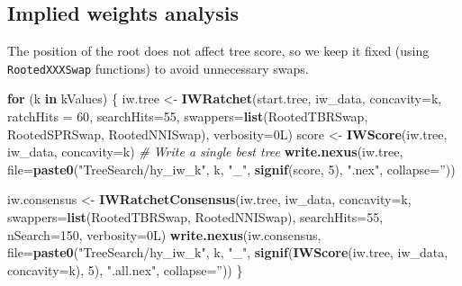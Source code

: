 \documentclass[openany]{book}
\newenvironment{Shaded}{\begin{snugshade}}{\end{snugshade}}
\newcommand{\KeywordTok}[1]{\textcolor[rgb]{0.13,0.29,0.53}{\textbf{#1}}}
\newcommand{\DataTypeTok}[1]{\textcolor[rgb]{0.13,0.29,0.53}{#1}}
\newcommand{\DecValTok}[1]{\textcolor[rgb]{0.00,0.00,0.81}{#1}}
\newcommand{\StringTok}[1]{\textcolor[rgb]{0.31,0.60,0.02}{#1}}
\newcommand{\CommentTok}[1]{\textcolor[rgb]{0.56,0.35,0.01}{\textit{#1}}}
\newcommand{\ControlFlowTok}[1]{\textcolor[rgb]{0.13,0.29,0.53}{\textbf{#1}}}
\newcommand{\NormalTok}[1]{#1}
\theoremstyle{definition}
\theoremstyle{definition}
\theoremstyle{definition}
\theoremstyle{remark}
\begin{document}
\subsection{Implied weights analysis}\label{implied-weights-analysis}

The position of the root does not affect tree score, so we keep it fixed
(using \texttt{RootedXXXSwap} functions) to avoid unnecessary swaps.

\begin{Shaded}
\begin{Highlighting}[]
\ControlFlowTok{for}\NormalTok{ (k }\ControlFlowTok{in}\NormalTok{ kValues) \{}
\NormalTok{  iw.tree <-}\StringTok{ }\KeywordTok{IWRatchet}\NormalTok{(start.tree, iw_data, }\DataTypeTok{concavity=}\NormalTok{k,}
                       \DataTypeTok{ratchHits =} \DecValTok{60}\NormalTok{, }\DataTypeTok{searchHits=}\DecValTok{55}\NormalTok{,}
                       \DataTypeTok{swappers=}\KeywordTok{list}\NormalTok{(RootedTBRSwap, RootedSPRSwap, RootedNNISwap),}
                       \DataTypeTok{verbosity=}\NormalTok{0L)}
\NormalTok{  score <-}\StringTok{ }\KeywordTok{IWScore}\NormalTok{(iw.tree, iw_data, }\DataTypeTok{concavity=}\NormalTok{k)}
  \CommentTok{# Write a single best tree}
  \KeywordTok{write.nexus}\NormalTok{(iw.tree,}
              \DataTypeTok{file=}\KeywordTok{paste0}\NormalTok{(}\StringTok{"TreeSearch/hy_iw_k"}\NormalTok{, k, }\StringTok{"_"}\NormalTok{, }
                          \KeywordTok{signif}\NormalTok{(score, }\DecValTok{5}\NormalTok{), }\StringTok{".nex"}\NormalTok{, }\DataTypeTok{collapse=}\StringTok{''}\NormalTok{))}

\NormalTok{  iw.consensus <-}\StringTok{ }\KeywordTok{IWRatchetConsensus}\NormalTok{(iw.tree, iw_data, }\DataTypeTok{concavity=}\NormalTok{k,}
                  \DataTypeTok{swappers=}\KeywordTok{list}\NormalTok{(RootedTBRSwap, RootedNNISwap),}
                  \DataTypeTok{searchHits=}\DecValTok{55}\NormalTok{,}
                  \DataTypeTok{nSearch=}\DecValTok{150}\NormalTok{, }\DataTypeTok{verbosity=}\NormalTok{0L)}
  \KeywordTok{write.nexus}\NormalTok{(iw.consensus, }
              \DataTypeTok{file=}\KeywordTok{paste0}\NormalTok{(}\StringTok{"TreeSearch/hy_iw_k"}\NormalTok{, k, }\StringTok{"_"}\NormalTok{, }
                          \KeywordTok{signif}\NormalTok{(}\KeywordTok{IWScore}\NormalTok{(iw.tree, iw_data, }\DataTypeTok{concavity=}\NormalTok{k), }\DecValTok{5}\NormalTok{),}
                          \StringTok{".all.nex"}\NormalTok{, }\DataTypeTok{collapse=}\StringTok{''}\NormalTok{))}
\NormalTok{\}}
\end{Highlighting}
\end{Shaded}
\end{document}
